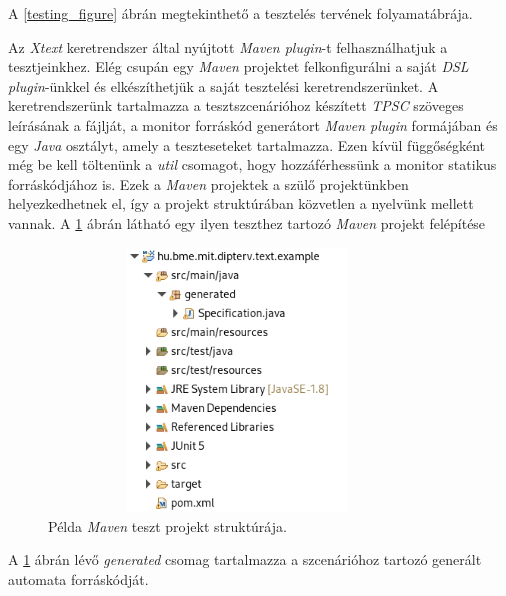 A \ref{testing_figure} ábrán megtekinthető a tesztelés tervének folyamatábrája.

\clearpage

Az \textit{Xtext} keretrendszer által nyújtott \textit{Maven plugin}-t felhasználhatjuk a tesztjeinkhez.
Elég csupán egy \textit{Maven} projektet felkonfigurálni a saját \textit{DSL plugin}-ünkkel és elkészíthetjük a saját tesztelési keretrendszerünket.
A keretrendszerünk tartalmazza a tesztszcenárióhoz készített \textit{TPSC} szöveges leírásának a fájlját, a monitor forráskód generátort \textit{Maven plugin} formájában és egy \textit{Java} osztályt, amely a teszteseteket tartalmazza.
Ezen kívül függőségként még be kell töltenünk a \textit{util} csomagot, hogy hozzáférhessünk a monitor statikus forráskódjához is.
Ezek a \textit{Maven} projektek a szülő projektünkben helyezkedhetnek el, így a projekt struktúrában közvetlen a nyelvünk mellett vannak.
A \ref{integration_test_structure} ábrán látható egy ilyen teszthez tartozó \textit{Maven} projekt felépítése

\begin{figure}[!ht]
    \centering
    \includegraphics[width=100mm, height=7cm, keepaspectratio]{figures/test_example_structure.png}
    \caption{Példa \textit{Maven} teszt projekt struktúrája.}
    \label{integration_test_structure}
\end{figure}

A \ref{integration_test_structure} ábrán lévő \textit{generated} csomag tartalmazza a szcenárióhoz tartozó generált automata forráskódját.

